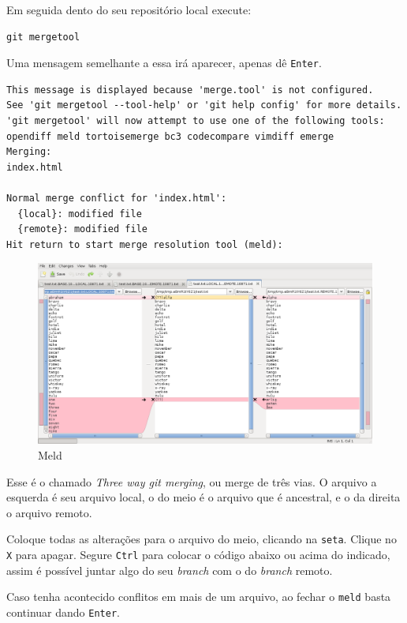 Em seguida dento do seu repositório local execute:

\begin{verbatim}
git mergetool
\end{verbatim}

Uma mensagem semelhante a essa irá aparecer, apenas dê \texttt{Enter}.

\begin{verbatim}
This message is displayed because 'merge.tool' is not configured.
See 'git mergetool --tool-help' or 'git help config' for more details.
'git mergetool' will now attempt to use one of the following tools:
opendiff meld tortoisemerge bc3 codecompare vimdiff emerge
Merging:
index.html

Normal merge conflict for 'index.html':
  {local}: modified file
  {remote}: modified file
Hit return to start merge resolution tool (meld):
\end{verbatim}

\begin{figure}[H]
    \includegraphics[scale=0.35]{img/meld3.png}
    \caption{Meld}
\end{figure}

Esse é o chamado \emph{Three way git merging}, ou merge de três vias. O
arquivo a esquerda é seu arquivo local, o do meio é o arquivo que é
ancestral, e o da direita o arquivo remoto.

Coloque todas as alterações para o arquivo do meio, clicando na
\texttt{seta}. Clique no \texttt{X} para apagar. Segure \texttt{Ctrl}
para colocar o código abaixo ou acima do indicado, assim é possível
juntar algo do seu \emph{branch} com o do \emph{branch} remoto.

Caso tenha acontecido conflitos em mais de um arquivo, ao fechar o
\texttt{meld} basta continuar dando \texttt{Enter}.
